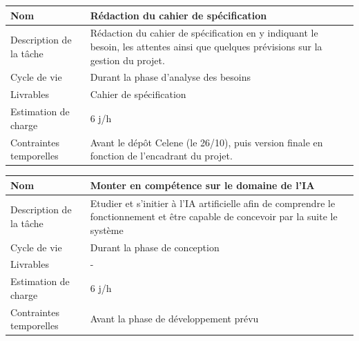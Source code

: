 \documentclass[CDS,UTF8,final]{EPURapport}
\begin{document}
\newpage

\begin{table}[h!]
\centering
\begin{tabular}{|p{4cm}|p{10cm}|}
\hline
Nom                     & Rédaction du cahier de spécification                                                                                                \\ \hline
Description de la tâche & Rédaction du cahier de spécification en y indiquant le besoin, les attentes ainsi que quelques prévisions sur la gestion du projet. \\ \hline
Cycle de vie            & Durant la phase d'analyse des besoins                                                                                               \\ \hline
Livrables               & Cahier de spécification                                                                                                             \\ \hline
Estimation de charge    & 6 j/h                                                                                                                               \\ \hline
Contraintes temporelles & Avant le dépôt Celene (le 26/10), puis version finale en fonction de l'encadrant du projet.                                         \\ \hline

\end{tabular}
\end{table}
\par

\begin{table}[h!]
\centering
\begin{tabular}{|p{4cm}|p{10cm}|}
\hline
Nom                     & Monter en compétence sur le domaine de l'IA                                                                                        \\ \hline
Description de la tâche & Etudier et s'initier à l'IA artificielle afin de comprendre le fonctionnement et être capable de concevoir par la suite le système \\ \hline
Cycle de vie            & Durant la phase de conception                                                                                                      \\ \hline
Livrables               & -                                                                                                                                    \\ \hline
Estimation de charge    & 6 j/h                                                                                                                              \\ \hline
Contraintes temporelles & Avant la phase de développement prévu                                                                                              \\ \hline

\end{tabular}
\end{table}
\par
\end{document}
